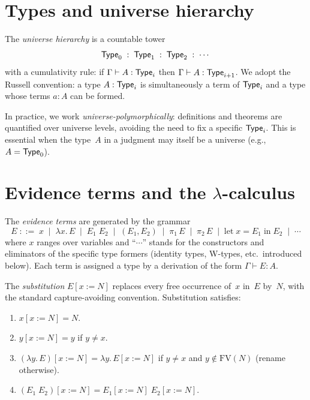 \section{Types and universe hierarchy}
\label{sec:universes}

\begin{definition}
\label{def:universe}
The \emph{universe hierarchy} is a countable tower
\[
  \mathsf{Type}_0 \;:\; \mathsf{Type}_1 \;:\; \mathsf{Type}_2 \;:\; \cdots
\]
with a cumulativity rule: if $\Gamma \vdash A : \mathsf{Type}_i$ then
$\Gamma \vdash A : \mathsf{Type}_{i+1}$.  We adopt the Russell convention:
a type $A : \mathsf{Type}_i$ is simultaneously a term of $\mathsf{Type}_i$ and a
type whose terms $a : A$ can be formed.
\end{definition}

\begin{remark}
In practice, we work \emph{universe-polymorphically}: definitions and
theorems are quantified over universe levels, avoiding the need to fix
a specific $\mathsf{Type}_i$.  This is essential when the type~$A$ in a
judgment may itself be a universe (e.g., $A = \mathsf{Type}_0$).
\end{remark}

\section{Evidence terms and the $\lambda$-calculus}

\begin{definition}
\label{def:terms}
The \emph{evidence terms} are generated by the grammar
\[
  E \;::=\; x \;\mid\; \lambda x.\, E \;\mid\; E_1\; E_2
  \;\mid\; (E_1, E_2) \;\mid\; \pi_1\, E \;\mid\; \pi_2\, E
  \;\mid\; \mathrm{let}\; x = E_1 \;\mathrm{in}\; E_2
  \;\mid\; \cdots
\]
where $x$ ranges over variables and ``$\cdots$'' stands for the
constructors and eliminators of the specific type formers (identity
types, W-types, etc.\ introduced below).  Each term is assigned a type
by a derivation of the form $\Gamma \vdash E : A$.
\end{definition}

\begin{definition}
The \emph{substitution} $E[x := N]$ replaces every free occurrence
of~$x$ in~$E$ by~$N$, with the standard capture-avoiding convention.
Substitution satisfies:
\begin{enumerate}[label=(\alph*),nosep]
\item $x[x := N] = N$.
\item $y[x := N] = y$ if $y \neq x$.
\item $(\lambda y.\, E)[x := N] = \lambda y.\, E[x := N]$ if
  $y \neq x$ and $y \notin \mathrm{FV}(N)$ (rename otherwise).
\item $(E_1 \; E_2)[x := N] = E_1[x := N] \; E_2[x := N]$.
\end{enumerate}
\end{definition}

